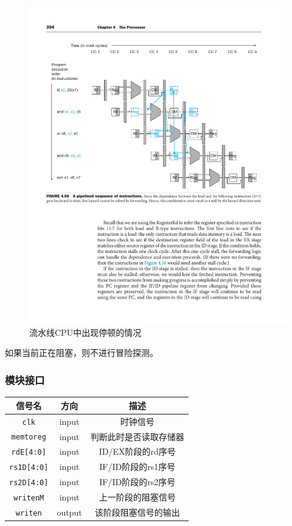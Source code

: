 \documentclass[UTF8,a4paper,autofakebold,15pt]{ctexart}
\begin{document}
\begin{figure}[ht]
	\centering
	\includegraphics{fig5.pdf}
	\caption{流水线CPU中出现停顿的情况\cite{ref1}}
	\label{fig:label5}
\end{figure}

如果当前正在阻塞，则不进行冒险探测。

\subsubsection{模块接口}

\begin{center}
	\begin{tabular}{|c|c|c|}
		\hline
		信号名&方向&描述\\
		\hline
		{\tt clk}&input&时钟信号\\
		\hline
		{\tt memtoreg}&input&判断此时是否读取存储器\\
		\hline
		{\tt rdE[4:0]}&input&ID/EX阶段的rd序号\\
		\hline
		{\tt rs1D[4:0]}&input&IF/ID阶段的rs1序号\\
		\hline
		{\tt rs2D[4:0]}&input&IF/ID阶段的rs2序号\\
		\hline
		{\tt writenM}&input&上一阶段的阻塞信号\\
		\hline
		{\tt writen}&output&该阶段阻塞信号的输出\\
		\hline
	\end{tabular}
\end{center}
\end{document}

